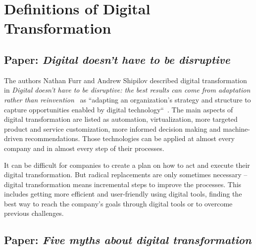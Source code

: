 \documentclass[a4]{scrartcl}
\begin{document}
	\section{Definitions of Digital Transformation} \label{sec:Sec1}







	\subsection{Paper: \textit{Digital doesn't have to be disruptive}} \label{disruptive}
	
	The authors Nathan Furr and Andrew Shipilov described digital transformation in \textit{Digital doesn't have to be disruptive: the best results can come from adaptation rather than reinvention}~\cite{disruptive} as ``adapting an organization's strategy and structure to capture opportunities enabled by digital technology``~\cite[p. 96]{disruptive}.
	The main aspects of digital transformation are listed as automation, virtualization, more targeted product and service customization, more informed decision making and machine-driven recommendations. Those technologies can be applied at almost every company and in almost every step of their processes.~\cite{disruptive}
	
	It can be difficult for companies to create a plan on how to act and execute their digital transformation. But radical replacements are only sometimes necessary -- digital transformation means incremental steps to improve the processes. This includes getting more efficient and user-friendly using digital tools, finding the best way to reach the company's goals through digital tools or to overcome previous challenges.~\cite{disruptive}
	









\subsection{Paper: \textit{Five myths about digital transformation}} \label{5myths}	
	
\end{document}
